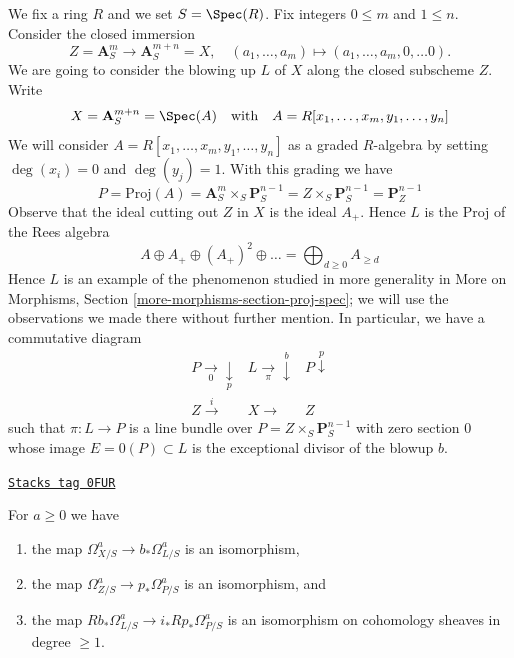 \medskip\noindent
We fix a ring $R$ and we set $S = \Spec(R)$. Fix integers $0 \leq m$ and
$1 \leq n$. Consider the closed immersion
$$
Z = \mathbf{A}^m_S \longrightarrow \mathbf{A}^{m + n}_S = X,\quad
(a_1, \ldots, a_m) \mapsto (a_1, \ldots, a_m, 0, \ldots 0).
$$
We are going to consider the blowing up $L$ of $X$
along the closed subscheme $Z$. Write
$$
X =
\mathbf{A}^{m + n}_S =
\Spec(A)
\quad\text{with}\quad
A = R[x_1, \ldots, x_m, y_1, \ldots, y_n]
$$
We will consider $A = R[x_1, \ldots, x_m, y_1, \ldots, y_n]$ as a
graded $R$-algebra by setting $\deg(x_i) = 0$ and $\deg(y_j) = 1$.
With this grading we have
$$
P =
\text{Proj}(A) =
\mathbf{A}^m_S \times_S \mathbf{P}^{n - 1}_S =
Z \times_S \mathbf{P}^{n - 1}_S =
\mathbf{P}^{n - 1}_Z
$$
Observe that the ideal cutting out $Z$ in $X$ is the ideal $A_+$.
Hence $L$ is the Proj of the Rees algebra
$$
A \oplus A_+ \oplus (A_+)^2 \oplus \ldots =
\bigoplus\nolimits_{d \geq 0} A_{\geq d}
$$
Hence $L$ is an example of the phenomenon studied in
more generality in More on Morphisms, Section
\ref{more-morphisms-section-proj-spec};
we will use the observations we made there without further mention.
In particular, we have a commutative diagram
$$
\begin{array}{ccc}P \underset{0}{\longrightarrow}\underset{p}{\downarrow} & L \underset{\pi}{\longrightarrow}\overset{b}{\downarrow} & P \overset{p}{\downarrow} \\ Z \overset{i}{\longrightarrow} & X \longrightarrow & Z\end{array}
$$
such that $\pi : L \to P$ is a line bundle over
$P = Z \times_S \mathbf{P}^{n - 1}_S$
with zero section $0$ whose image $E = 0(P) \subset L$
is the exceptional divisor of the blowup $b$.

\begin{lemma}[Comparison]
\label{derham-lemma-comparison}
\href{https://stacks.math.columbia.edu/tag/0FUR}{\texttt{Stacks tag 0FUR}}

For $a \geq 0$ we have
\begin{enumerate}
\item the map
$\Omega^a_{X/S} \to b_*\Omega^a_{L/S}$ is an isomorphism,
\item the map $\Omega^a_{Z/S} \to p_*\Omega^a_{P/S}$ is an isomorphism,
and
\item the map $Rb_*\Omega^a_{L/S} \to i_*Rp_*\Omega^a_{P/S}$ is an isomorphism
on cohomology sheaves in degree $\geq 1$.
\end{enumerate}
\end{lemma}


